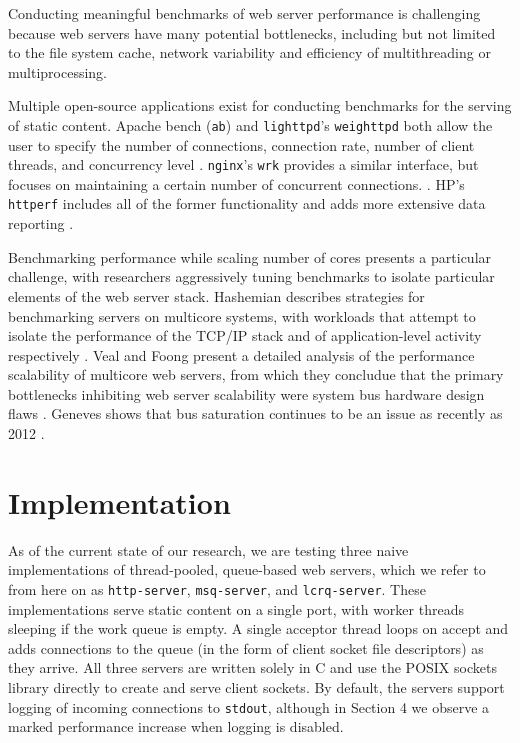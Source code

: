 \documentclass[twoside,10pt]{article}
\begin{document}
\begin{multicols}{2}
Conducting meaningful benchmarks of web server performance is
challenging because web servers have many potential bottlenecks,
including but not limited to the file system cache, network
variability and efficiency of multithreading or multiprocessing.

Multiple open-source applications exist for conducting benchmarks for
the serving of static content. Apache bench (\verb+ab+) and
\verb+lighttpd+'s \verb+weighttpd+ both allow the user to specify the
number of connections, connection rate, number of client threads, and
concurrency level
\cite{fielding1997apache,kneschke2003lighttpd}. \verb+nginx+'s
\verb+wrk+ provides a similar interface, but focuses on maintaining a
certain number of concurrent connections. \cite{syosevnginx}. HP's
\verb+httperf+ includes all of the former functionality and adds more
extensive data reporting \cite{mosberger1998httperf}.

Benchmarking performance while scaling number of cores presents a
particular challenge, with researchers aggressively tuning benchmarks
to isolate particular elements of the web server stack. Hashemian
describes strategies for benchmarking servers on multicore systems,
with workloads that attempt to isolate the performance of the TCP/IP
stack and of application-level activity respectively
\cite{hashemian2013improving}. Veal and Foong present a detailed
analysis of the performance scalability of multicore web servers, from
which they concludue that the primary bottlenecks inhibiting web
server scalability were system bus hardware design flaws
\cite{veal2007performance}. Geneves shows that bus saturation
continues to be an issue as recently as 2012
\cite{geneves2012analysis}.

\section{Implementation}
As of the current state of our research, we are testing three naive
implementations of thread-pooled, queue-based web servers, which we
refer to from here on as \verb+http-server+, \verb+msq-server+, and
\verb+lcrq-server+. These implementations serve static content on a
single port, with worker threads sleeping if the work queue is
empty. A single acceptor thread loops on accept and adds connections
to the queue (in the form of client socket file descriptors) as they
arrive. All three servers are written solely in C and use the POSIX
sockets library directly to create and serve client sockets. By
default, the servers support logging of incoming connections to
\verb+stdout+, although in Section 4 we observe a marked performance
increase when logging is disabled.


\end{multicols}
\end{document}
